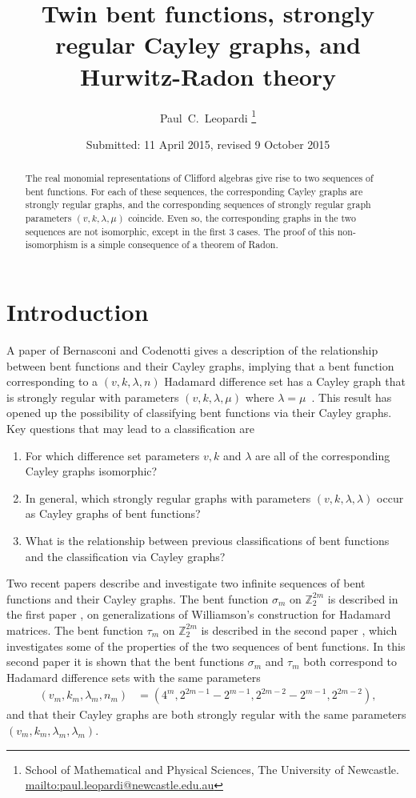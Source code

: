 \documentclass[12pt,a4paper]{article}
\title{Twin bent functions, strongly regular Cayley graphs, and Hurwitz-Radon theory}
\author{
Paul~C.~Leopardi
\thanks{School of Mathematical and Physical Sciences, The University of Newcastle.
\protect\url{mailto:paul.leopardi@newcastle.edu.au}}
}
\date{Submitted: 11 April 2015, revised 9 October 2015}
\newcommand{\mb}[1]{\mathbb{#1}}
\newcommand{\Z}{\mb{Z}}
\begin{document}
\maketitle

\begin{abstract}
%
The real monomial representations of Clifford algebras
give rise to two sequences of bent functions.
For each of these sequences, the corresponding Cayley graphs are 
strongly regular graphs, and the corresponding sequences of strongly regular graph parameters
$(v,k,\lambda,\mu)$ coincide.
Even so, the corresponding graphs in the two sequences are not isomorphic, except in the first 3 cases.
The proof of this non-isomorphism is a simple consequence of a theorem of Radon.  
%
\end{abstract}

\section{Introduction}
\label{sec-Introduction}
A paper of Bernasconi and Codenotti gives a description of the relationship between bent functions and
their Cayley graphs, implying that a bent function corresponding to a $(v,k,\lambda,n)$ Hadamard difference set has a Cayley graph 
that is strongly regular with parameters $(v,k,\lambda,\mu)$ where $\lambda=\mu$~\cite[Lemma 12]{BerC99}.
This result has opened up the possibility of classifying bent functions via their Cayley graphs.
Key questions that may lead to a classification are
\begin{enumerate}
\item For which difference set parameters $v, k$ and $\lambda$ are all of the corresponding Cayley graphs isomorphic?
\item In general, which strongly regular graphs with parameters $(v,k,\lambda,\lambda)$ occur as Cayley graphs of bent functions?
\item What is the relationship between previous classifications of bent functions and the classification via Cayley graphs?
\end{enumerate}

Two recent papers \cite{Leo14Constructions,Leo15Bent} describe and investigate two infinite sequences of bent functions and their Cayley graphs.
The bent function $\sigma_m$ on $\Z_2^{2 m}$ is described in the first paper \cite{Leo14Constructions}, on 
generalizations of Williamson's construction for Hada\-mard matrices.
The bent function $\tau_m$ on $\Z_2^{2 m}$ is described in the second paper \cite{Leo15Bent},
which investigates some of the properties of the two sequences of bent functions.
In this second paper it is shown that the bent functions $\sigma_m$ and $\tau_m$ both correspond to Hadamard difference sets with the same parameters
\begin{align*}
(v_m,k_m,\lambda_m,n_m) &= (4^m, 2^{2 m - 1} - 2^{m-1}, 2^{2 m - 2} - 2^{m-1}, 2^{2 m - 2}),
\end{align*}
and that their Cayley graphs are both strongly regular with the same parameters $(v_m,k_m,\lambda_m,\lambda_m)$.
\end{document}
